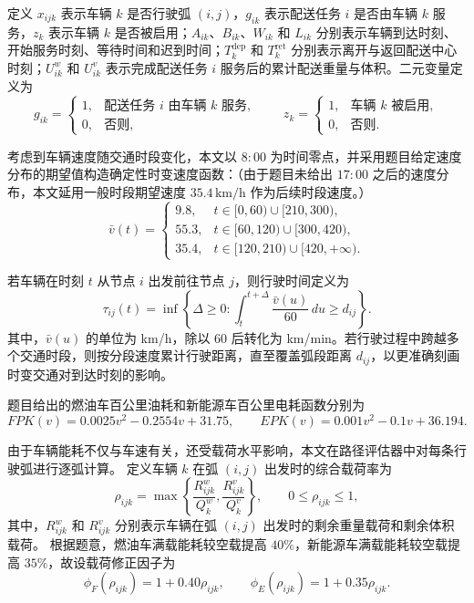 \documentclass[withoutpreface,bwprint]{cumcmthesis} %
\begin{document}
定义 $x_{ijk}$ 表示车辆 $k$ 是否行驶弧 $(i,j)$，$g_{ik}$ 表示配送任务 $i$ 是否由车辆 $k$ 服务，$z_k$ 表示车辆 $k$ 是否被启用；$A_{ik}$、$B_{ik}$、$W_{ik}$ 和 $L_{ik}$ 分别表示车辆到达时刻、开始服务时刻、等待时间和迟到时间；$T_k^{\mathrm{dep}}$ 和 $T_k^{\mathrm{ret}}$ 分别表示离开与返回配送中心时刻；$U_{ik}^w$ 和 $U_{ik}^v$ 表示完成配送任务 $i$ 服务后的累计配送重量与体积。二元变量定义为
\begin{equation}
g_{ik}=
\begin{cases}
1, & \text{配送任务 } i \text{ 由车辆 } k \text{ 服务},\\
0, & \text{否则},
\end{cases}
\qquad
z_k=
\begin{cases}
1, & \text{车辆 } k \text{ 被启用},\\
0, & \text{否则}.
\end{cases}
\label{eq:gik_zk}
\end{equation}

考虑到车辆速度随交通时段变化，本文以 $8{:}00$ 为时间零点，并采用题目给定速度分布的期望值构造确定性时变速度函数：（由于题目未给出 $17{:}00$ 之后的速度分布，本文延用一般时段期望速度 $35.4\,\mathrm{km/h}$ 作为后续时段速度。）
\begin{equation}
\bar v(t)=
\begin{cases}
9.8,  & t\in[0,60)\cup[210,300),\\
55.3, & t\in[60,120)\cup[300,420),\\
35.4, & t\in[120,210)\cup[420,+\infty).
\end{cases}
\label{eq:speed_function}
\end{equation}

若车辆在时刻 $t$ 从节点 $i$ 出发前往节点 $j$，则行驶时间定义为
\begin{equation}
\tau_{ij}(t)=
\inf\left\{\Delta\geq 0:
\int_t^{t+\Delta}\frac{\bar v(u)}{60}\,du\geq d_{ij}
\right\}.
\label{eq:travel_time}
\end{equation}
其中，$\bar v(u)$ 的单位为 km/h，除以 $60$ 后转化为 km/min。若行驶过程中跨越多个交通时段，则按分段速度累计行驶距离，直至覆盖弧段距离 $d_{ij}$，以更准确刻画时变交通对到达时刻的影响\cite{cao2018}。

题目给出的燃油车百公里油耗和新能源车百公里电耗函数分别为
\begin{equation}
FPK(v)=0.0025v^2-0.2554v+31.75,\qquad
EPK(v)=0.001v^2-0.1v+36.194.
\label{eq:energy_function}
\end{equation}

由于车辆能耗不仅与车速有关，还受载荷水平影响，本文在路径评估器中对每条行驶弧进行逐弧计算。
定义车辆 $k$ 在弧 $(i,j)$ 出发时的综合载荷率为
\begin{equation}
\rho_{ijk}=
\max\left\{
\frac{R_{ijk}^w}{Q_k^w},
\frac{R_{ijk}^v}{Q_k^v}
\right\},
\qquad 0\leq \rho_{ijk}\leq 1,
\label{eq:load_ratio}
\end{equation}
其中，$R_{ijk}^w$ 和 $R_{ijk}^v$ 分别表示车辆在弧 $(i,j)$ 出发时的剩余重量载荷和剩余体积载荷。
根据题意，燃油车满载能耗较空载提高 $40\%$，新能源车满载能耗较空载提高 $35\%$，故设载荷修正因子为
\begin{equation}
\phi_F(\rho_{ijk})=1+0.40\rho_{ijk},
\qquad
\phi_E(\rho_{ijk})=1+0.35\rho_{ijk}.
\label{eq:load_factor}
\end{equation}
\end{document}
